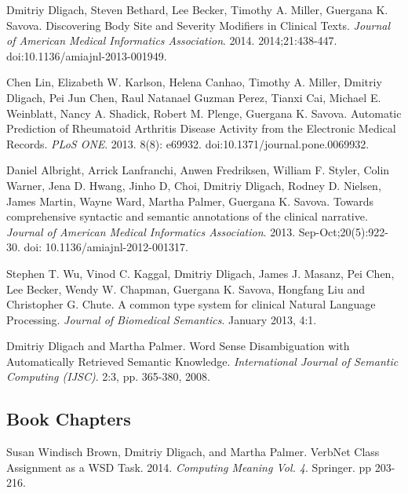 \documentclass[letterpaper]{article}
\renewenvironment{itemize}{
  \begin{list}{}{
    \setlength{\leftmargin}{1.5em}
  }
}{
  \end{list}
}
\begin{document}
\begin{itemize}
\item Dmitriy Dligach, Steven Bethard, Lee Becker, Timothy A. Miller, Guergana K. Savova. Discovering Body Site and Severity Modifiers in Clinical Texts. \emph{Journal of American Medical Informatics Association}. 2014. 2014;21:438-447. doi:10.1136/amiajnl-2013-001949.
\item Chen Lin, Elizabeth W. Karlson, Helena Canhao, Timothy A. Miller, Dmitriy Dligach, Pei Jun Chen, Raul Natanael Guzman Perez, Tianxi Cai, Michael E. Weinblatt, Nancy A. Shadick, Robert M. Plenge, Guergana K. Savova. Automatic Prediction of Rheumatoid Arthritis Disease Activity from the Electronic Medical Records. \emph{PLoS ONE}. 2013. 8(8): e69932. doi:10.1371/journal.pone.0069932.
\item Daniel Albright, Arrick Lanfranchi, Anwen Fredriksen, William F. Styler, Colin Warner, Jena D. Hwang, Jinho D, Choi, Dmitriy Dligach, Rodney D. Nielsen, James Martin, Wayne Ward, Martha Palmer, Guergana K. Savova. Towards comprehensive syntactic and semantic annotations of the clinical narrative. \emph{Journal of American Medical Informatics Association}. 2013. Sep-Oct;20(5):922-30. doi: 10.1136/amiajnl-2012-001317.
\item Stephen T. Wu, Vinod C. Kaggal, Dmitriy Dligach, James J. Masanz, Pei Chen, Lee Becker, Wendy W. Chapman, Guergana K. Savova, Hongfang Liu and Christopher G. Chute. A common type system for clinical Natural Language Processing. \emph{Journal of Biomedical Semantics}. January 2013, 4:1.
\item Dmitriy Dligach and Martha Palmer. Word Sense Disambiguation with Automatically Retrieved Semantic Knowledge. \emph {International Journal of Semantic Computing (IJSC)}. 2:3, pp. 365-380, 2008.
\end{itemize}

\subsection*{Book Chapters}
\begin{itemize}
\item Susan Windisch Brown, Dmitriy Dligach, and Martha Palmer. VerbNet Class Assignment as a WSD Task. 2014. \emph{Computing Meaning Vol. 4}. Springer. pp 203-216.
\end{itemize}
\end{document}
